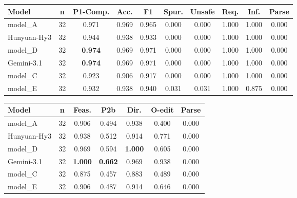 \begin{center}
\label{tab:appendix_circuit_p1}
\scriptsize
\setlength{\tabcolsep}{3.5pt}
\renewcommand{\arraystretch}{1.08}
\begin{tabular}{lccccccccc}
\toprule
Model & n & P1-Comp. & Acc. & F1 & Spur. & Unsafe & Req. & Inf. & Parse \\
\midrule
model_A & 32 & 0.971 & 0.969 & 0.965 & 0.000 & 0.000 & 1.000 & 1.000 & 0.000 \\
Hunyuan-Hy3 & 32 & 0.944 & 0.938 & 0.933 & 0.000 & 0.000 & 1.000 & 1.000 & 0.000 \\
model_D & 32 & \textbf{0.974} & 0.969 & 0.971 & 0.000 & 0.000 & 1.000 & 1.000 & 0.000 \\
Gemini-3.1 & 32 & \textbf{0.974} & 0.969 & 0.971 & 0.000 & 0.000 & 1.000 & 1.000 & 0.000 \\
model_C & 32 & 0.923 & 0.906 & 0.917 & 0.000 & 0.000 & 1.000 & 1.000 & 0.000 \\
model_E & 32 & 0.932 & 0.938 & 0.940 & 0.031 & 0.031 & 1.000 & 0.875 & 0.000 \\
\bottomrule
\end{tabular}
\end{center}

\begin{center}
\label{tab:appendix_circuit_p2}
\scriptsize
\setlength{\tabcolsep}{4pt}
\renewcommand{\arraystretch}{1.08}
\begin{tabular}{lcccccc}
\toprule
Model & n & Feas. & P2b & Dir. & O-edit & Parse \\
\midrule
model_A & 32 & 0.906 & 0.494 & 0.938 & 0.400 & 0.000 \\
Hunyuan-Hy3 & 32 & 0.938 & 0.512 & 0.914 & 0.771 & 0.000 \\
model_D & 32 & 0.969 & 0.594 & \textbf{1.000} & 0.605 & 0.000 \\
Gemini-3.1 & 32 & \textbf{1.000} & \textbf{0.662} & 0.969 & 0.938 & 0.000 \\
model_C & 32 & 0.875 & 0.457 & 0.883 & 0.489 & 0.000 \\
model_E & 32 & 0.906 & 0.487 & 0.914 & 0.646 & 0.000 \\
\bottomrule
\end{tabular}
\end{center}

